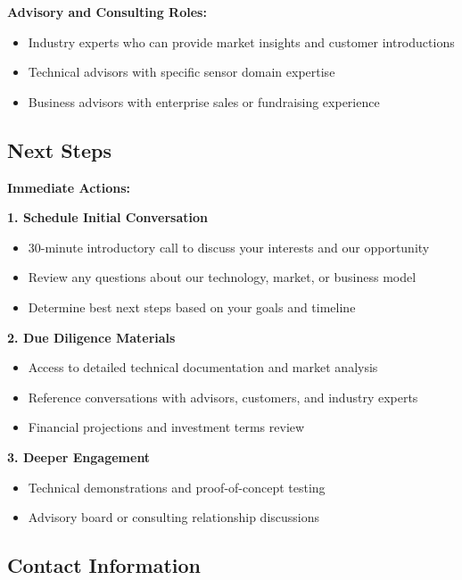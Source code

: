 \documentclass[11pt,letterpaper]{article}
\begin{document}
\textbf{Advisory and Consulting Roles:}
\begin{itemize}[leftmargin=10pt, itemsep=1pt]
    \item Industry experts who can provide market insights and customer introductions
    \item Technical advisors with specific sensor domain expertise
    \item Business advisors with enterprise sales or fundraising experience
\end{itemize}

\subsection*{Next Steps}

\textbf{Immediate Actions:}

\textbf{1. Schedule Initial Conversation}
\begin{itemize}[leftmargin=10pt, itemsep=1pt]
    \item 30-minute introductory call to discuss your interests and our opportunity
    \item Review any questions about our technology, market, or business model
    \item Determine best next steps based on your goals and timeline
\end{itemize}

\textbf{2. Due Diligence Materials}
\begin{itemize}[leftmargin=10pt, itemsep=1pt]
    \item Access to detailed technical documentation and market analysis
    \item Reference conversations with advisors, customers, and industry experts
    \item Financial projections and investment terms review
\end{itemize}

\textbf{3. Deeper Engagement}
\begin{itemize}[leftmargin=10pt, itemsep=1pt]
    \item Technical demonstrations and proof-of-concept testing
    \item Advisory board or consulting relationship discussions
\end{itemize}

\subsection*{Contact Information}
\end{document}
